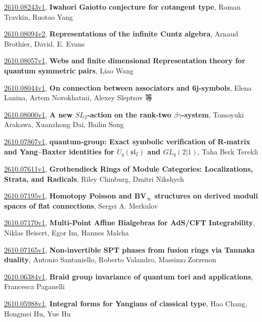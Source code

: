\documentclass[9pt, a4paper]{article}
\theoremstyle{plain}
\theoremstyle{definition}
\theoremstyle{remark}
\newcommand{\arxiv}[3]{\href{https://arxiv.org/abs/#1}{#1}, \textbf{\textcolor{arxivblue}{#2}}, #3}
\begin{document}
\arxiv{2610.08243v1}{Iwahori Gaiotto conjecture for cotangent type}{Roman Travkin, Ruotao Yang}

\arxiv{2610.08094v2}{Representations of the infinite Cuntz algebra}{Arnaud Brothier, David. E. Evans}

\arxiv{2610.08057v1}{Webs and finite dimensional Representation theory for quantum symmetric pairs}{Liao Wang}

\arxiv{2610.08044v1}{On connection between associators and 6j-symbols}{Elena Lanina, Artem Novokhatnii, Alexey Sleptsov 等}

\arxiv{2610.08000v1}{A new $SL_2$-action on the rank-two $βγ$-system}{Tomoyuki Arakawa, Xuanzhong Dai, Bailin Song}

\arxiv{2610.07867v1}{quantum-group: Exact symbolic verification of R-matrix and Yang--Baxter identities for $U_q(\mathfrak{sl}_2)$ and $GL_q(2|1)$}{Taha Berk Terekli}

\arxiv{2610.07611v1}{Grothendieck Rings of Module Categories: Localizations, Strata, and Radicals}{Riley Chinburg, Dmitri Nikshych}

\arxiv{2610.07195v1}{Homotopy Poisson and BV$_\infty$ structures on derived moduli spaces of flat connections}{Sergei A. Merkulov}

\arxiv{2610.07170v1}{Multi-Point Affine Bialgebras for AdS/CFT Integrability}{Niklas Beisert, Egor Im, Hannes Malcha}

\arxiv{2610.07165v1}{Non-invertible SPT phases from fusion rings via Tannaka duality}{Antonio Santaniello, Roberto Valandro, Massimo Zorzenon}

\arxiv{2610.06384v1}{Braid group invariance of quantum tori and applications}{Francesca Paganelli}

\arxiv{2610.05988v1}{Integral forms for Yangians of classical type}{Hao Chang, Hongmei Hu, Yue Hu}

\end{document}
